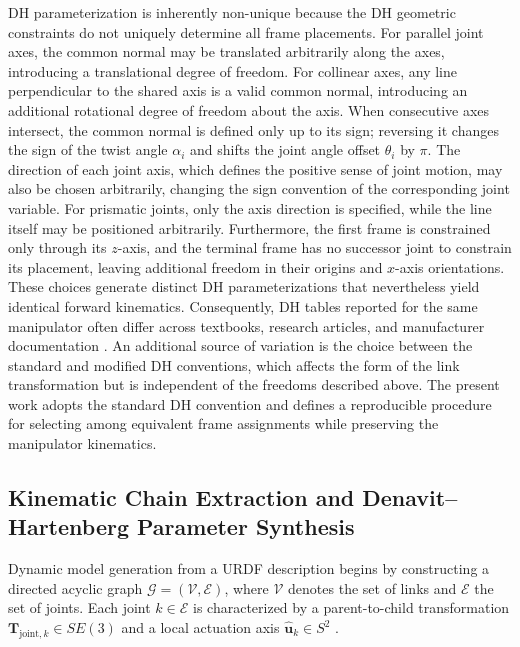 \documentclass[fleqn,10pt]{article}
\begin{document}
DH parameterization is inherently non-unique because the DH geometric constraints do not uniquely determine all frame placements. For parallel joint axes, the common normal may be translated arbitrarily along the axes, introducing a translational degree of freedom. For collinear axes, any line perpendicular to the shared axis is a valid common normal, introducing an additional rotational degree of freedom about the axis. When consecutive axes intersect, the common normal is defined only up to its sign; reversing it changes the sign of the twist angle $\alpha_i$ and shifts the joint angle offset $\theta_i$ by $\pi$. The direction of each joint axis, which defines the positive sense of joint motion, may also be chosen arbitrarily, changing the sign convention of the corresponding joint variable. For prismatic joints, only the axis direction is specified, while the line itself may be positioned arbitrarily. Furthermore, the first frame is constrained only through its $z$-axis, and the terminal frame has no successor joint to constrain its placement, leaving additional freedom in their origins and $x$-axis orientations. These choices generate distinct DH parameterizations that nevertheless yield identical forward kinematics. Consequently, DH tables reported for the same manipulator often differ across textbooks, research articles, and manufacturer documentation \cite{craig2005introduction, spong2020robot, siciliano2010robotics}. An additional source of variation is the choice between the standard and modified DH conventions, which affects the form of the link transformation but is independent of the freedoms described above. The present work adopts the standard DH convention and defines a reproducible procedure for selecting among equivalent frame assignments while preserving the manipulator kinematics.

\subsection{Kinematic Chain Extraction and Denavit--Hartenberg Parameter Synthesis}
\label{subsec:dh_synthesis}

Dynamic model generation from a URDF description begins by constructing a directed acyclic graph $\mathcal{G}=(\mathcal{V},\mathcal{E})$, where $\mathcal{V}$ denotes the set of links and $\mathcal{E}$ the set of joints. Each joint $k \in \mathcal{E}$ is characterized by a parent-to-child transformation $\bm{T}_{\mathrm{joint},k}\in SE(3)$ and a local actuation axis $\hat{\bm{u}}_k\in S^2$ \cite{ihab2026urdf2dt}.
\end{document}
